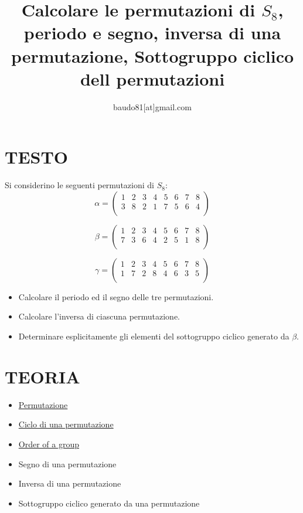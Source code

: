 \documentclass[a4paper,10pt]{article}
\title{Calcolare le permutazioni di $S_{8}$, periodo e segno, inversa di una permutazione, Sottogruppo ciclico dell permutazioni}
\author{baudo81[at]gmail.com}
\begin{document}
\maketitle


\section{TESTO}
Si considerino le seguenti permutazioni di $S_{8}$:
\[
 \alpha = \left( \begin{array}{cccccccc}
                  1 & 2 & 3 & 4 & 5 & 6 & 7 & 8 \\
                  3 & 8 & 2 & 1 & 7 & 5 & 6 & 4 \\
                 \end{array}
 \right)
\]

\[
  \beta = \left( \begin{array}{cccccccc}
                  1 & 2 & 3 & 4 & 5 & 6 & 7 & 8 \\
                  7 & 3 & 6 & 4 & 2 & 5 & 1 & 8 \\
                 \end{array}
 \right)
\]

\[
  \gamma = \left( \begin{array}{cccccccc}
                  1 & 2 & 3 & 4 & 5 & 6 & 7 & 8 \\
                  1 & 7 & 2 & 8 & 4 & 6 & 3 & 5 \\
                 \end{array}
 \right)
\]

\begin{itemize}
 \item Calcolare il periodo ed il segno delle tre permutazioni.
 \item Calcolare l'inversa di ciascuna permutazione.
 \item Determinare esplicitamente gli elementi del sottogruppo ciclico generato da $\beta$.
\end{itemize}


\section{TEORIA}
  \begin{itemize}
   \item \href{./Permutazione.html}{Permutazione}
   \item \href{./PermutazioniCicli.html}{Ciclo di una permutazione}
   \item \href{./OrderOfGroup.html}{Order of a group}
   \item Segno di una permutazione
   \item Inversa di una permutazione
   \item Sottogruppo ciclico generato da una permutazione
  \end{itemize}
\end{document}
